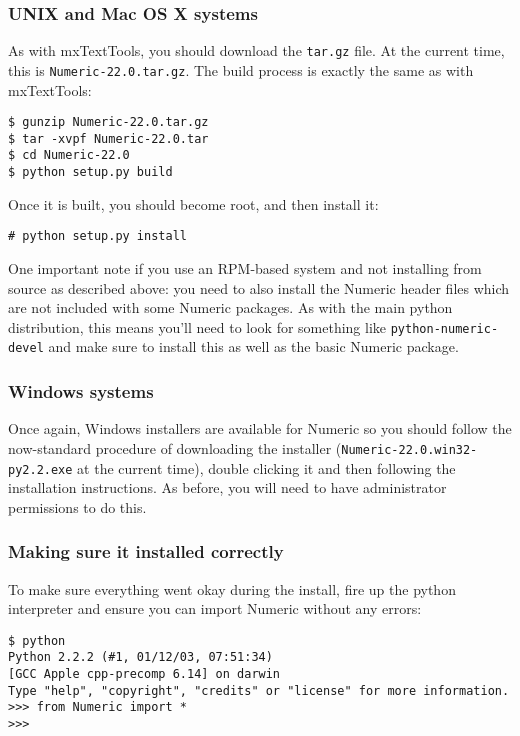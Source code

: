\documentclass{article}
\begin{document}
\subsubsection{UNIX and Mac OS X systems}

As with mxTextTools, you should download the \verb|tar.gz| file. At the
current time, this is \verb|Numeric-22.0.tar.gz|. The build
process is exactly the same as with mxTextTools:

\begin{verbatim}
$ gunzip Numeric-22.0.tar.gz 
$ tar -xvpf Numeric-22.0.tar
$ cd Numeric-22.0
$ python setup.py build
\end{verbatim}

Once it is built, you should become root, and then install it:

\begin{verbatim}
# python setup.py install
\end{verbatim}


One important note if you use an RPM-based system and not installing
from source as described above: you need to also
install the Numeric header files which are not included with some
Numeric packages. As with the main python distribution, this means
you'll need to look for something like \verb|python-numeric-devel| 
and make sure to install this as well as the basic Numeric package.

\subsubsection{Windows systems}

Once again, Windows installers are available for Numeric so you should
follow the now-standard procedure of downloading the installer
(\verb|Numeric-22.0.win32-py2.2.exe| at the current time), double
clicking it and then following the installation instructions. As before,
you will need to have administrator permissions to do this.

\subsubsection{Making sure it installed correctly}

To make sure everything went okay during the install, fire up the python
interpreter and ensure you can import Numeric without any errors:

\begin{verbatim}
$ python
Python 2.2.2 (#1, 01/12/03, 07:51:34) 
[GCC Apple cpp-precomp 6.14] on darwin
Type "help", "copyright", "credits" or "license" for more information.
>>> from Numeric import *
>>> 
\end{verbatim}
\end{document}

